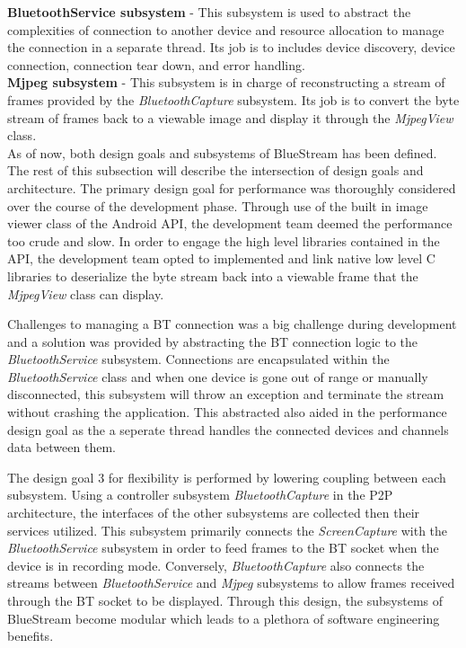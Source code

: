 \documentclass[a4paper,12pt]{article}
\begin{document}
\noindent \textbf{BluetoothService subsystem} - This subsystem is used to abstract the complexities of connection to another device and resource allocation to manage the connection in a separate thread. Its job is to includes device discovery, device connection, connection tear down, and error handling. \\

\noindent \textbf{Mjpeg subsystem} - This subsystem is in charge of reconstructing a stream of frames provided by the \textit{BluetoothCapture} subsystem. Its job is to convert the byte stream of frames back to a viewable image and display it through the \textit{MjpegView} class. \\


As of now, both design goals and subsystems of BlueStream has been defined. The rest of this subsection will describe the intersection of design goals and architecture. The primary design goal for performance was thoroughly considered over the course of the development phase. Through use of the built in image viewer class of the Android API, the development team deemed the performance too crude and slow. In order to engage the high level libraries contained in the API, the development team opted to implemented and link native low level C libraries to deserialize the byte stream back into a viewable frame that the \textit{MjpegView} class can display. 

Challenges to managing a BT connection was a big challenge during development and a solution was provided by abstracting the BT connection logic to the \textit{BluetoothService} subsystem. Connections are encapsulated within the \textit{BluetoothService} class and when one device is gone out of range or manually disconnected, this subsystem will throw an exception and terminate the stream without crashing the application. This abstracted also aided in the performance design goal as the a seperate thread handles the connected devices and channels data between them. 

The design goal 3 for flexibility is performed by lowering coupling between each subsystem. Using a controller subsystem \textit{BluetoothCapture} in the P2P architecture, the interfaces of the other subsystems are collected then their services utilized. This subsystem primarily connects the \textit{ScreenCapture} with the \textit{BluetoothService} subsystem in order to feed frames to the BT socket when the device is in recording mode. Conversely, \textit{BluetoothCapture} also connects the streams between \textit{BluetoothService} and \textit{Mjpeg} subsystems to allow frames received through the BT socket to be displayed. Through this design, the subsystems of BlueStream become modular which leads to a plethora of software engineering benefits.
\end{document}
